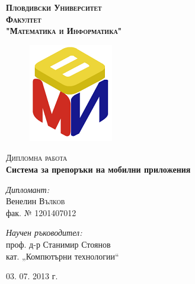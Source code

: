 
\begin{titlepage}

\begin{center}

\textsc{\huge \bfseries Пловдивски Университет}\\[1.0cm]
\textsc{\LARGE \bfseries Факултет \\"Математика и Информатика"}\\[1.5cm]

\begin{figure}[htb]
	\centering
	\includegraphics[scale=0.8]{assets/fmi-logo.png}
\end{figure}

\textsc{\Large Дипломна работа}\\[1.5cm]

{ \huge \bfseries Система за препоръки на мобилни приложения}\\[2.0cm]

\begin{minipage}{0.4\textwidth}
\begin{flushleft} \large
\emph{Дипломант:}\\
Венелин \textsc{Вълков} \\
\small
фак. № 1201407012
\end{flushleft}
\end{minipage}
\begin{minipage}{0.5\textwidth}
\begin{flushright} \large
\emph{Научен ръководител:} \\
проф. д-р Станимир Стоянов \\
\small
кат. \nolinebreak[4] „Компютърни \nolinebreak[4] технологии“ 
\end{flushright}
\end{minipage}

\vfill

{\large 03. 07. 2013 г.}

\end{center}

\end{titlepage}